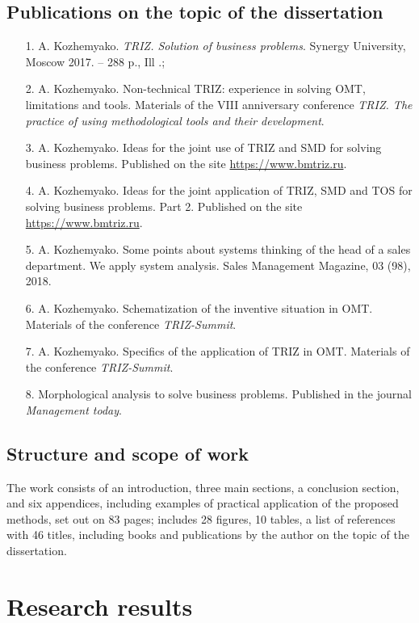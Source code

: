 \documentclass[11pt,a4paper]{book}
\begin{document}
\section{Publications on the topic of the dissertation}
\begin{itemize}
\item[1.] A. Kozhemyako. \emph{TRIZ. Solution of business problems}. 
  Synergy University, Moscow 2017. -- 288 p., Ill .;
\item[2.] A. Kozhemyako. Non-technical TRIZ: experience in solving
  OMT, limitations and tools. Materials of the
  VIII anniversary conference \emph{TRIZ. The practice of using methodological
    tools and their development}.
\item[3.] A. Kozhemyako. Ideas for the joint use of TRIZ and SMD for solving
  business problems. Published on the site \url{https://www.bmtriz.ru}.
\item[4.] A. Kozhemyako. Ideas for the joint application of TRIZ, SMD and TOS
  for solving business problems.  Part 2. Published on the site
  \url{https://www.bmtriz.ru}.
\item[5.] A. Kozhemyako. Some points about systems thinking of the head of a
  sales department.  We apply system analysis. Sales Management Magazine, 03
  (98), 2018.
\item[6.] A. Kozhemyako. Schematization of the inventive situation in
  OMT. Materials of the conference
  \emph{TRIZ-Summit}.
\item[7.] A. Kozhemyako. Specifics of the application of TRIZ in
  OMT. Materials of the conference
  \emph{TRIZ-Summit}.
\item[8.] Morphological analysis to solve business problems. Published in the
  journal \emph{Management today}.
\end{itemize}

\section{Structure and scope of work}
The work consists of an introduction, three main sections, a conclusion
section, and six appendices, including examples of practical application of
the proposed methods, set out on 83 pages; includes 28 figures, 10 tables, a
list of references with 46 titles, including books and publications by the
author on the topic of the dissertation.

\chapter{Research results}
\end{document}

